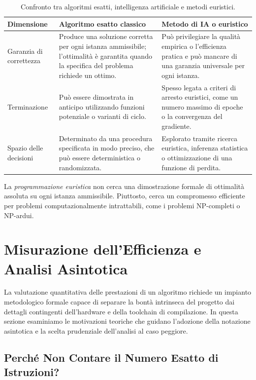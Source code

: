 \begin{table}[H]
  \centering
  \caption{Confronto tra algoritmi esatti, intelligenza artificiale e metodi euristici.}
  \label{tab:algorithm-comparison}
  \begin{tabularx}{\textwidth}{@{}>{\raggedright\arraybackslash}p{}YY@{}}
    \toprule
    Dimensione & Algoritmo esatto classico & Metodo di IA o euristico \\
    \midrule
    Garanzia di correttezza & Produce una soluzione corretta per ogni istanza ammissibile; l'ottimalità è garantita quando la specifica del problema richiede un ottimo. & Può privilegiare la qualità empirica o l'efficienza pratica e può mancare di una garanzia universale per ogni istanza. \\
    Terminazione & Può essere dimostrata in anticipo utilizzando funzioni potenziale o varianti di ciclo. & Spesso legata a criteri di arresto euristici, come un numero massimo di epoche o la convergenza del gradiente. \\
    Spazio delle decisioni & Determinato da una procedura specificata in modo preciso, che può essere deterministica o randomizzata. & Esplorato tramite ricerca euristica, inferenza statistica o ottimizzazione di una funzione di perdita. \\
    \bottomrule
  \end{tabularx}
\end{table}

La \emph{programmazione euristica} non cerca una dimostrazione formale di ottimalità assoluta su ogni istanza ammissibile. Piuttosto, cerca un compromesso efficiente per problemi computazionalmente intrattabili, come i problemi NP-completi o NP-ardui.

\FloatBarrier
\section{Misurazione dell'Efficienza e Analisi Asintotica}
\label{sec:asymptotic-analysis}

La valutazione quantitativa delle prestazioni di un algoritmo richiede un impianto metodologico formale capace di separare la bont\`a intrinseca del progetto dai dettagli contingenti dell'hardware e della toolchain di compilazione. In questa sezione esaminiamo le motivazioni teoriche che guidano l'adozione della notazione asintotica e la scelta prudenziale dell'analisi al caso peggiore.

\FloatBarrier
\subsection{Perché Non Contare il Numero Esatto di Istruzioni?}

